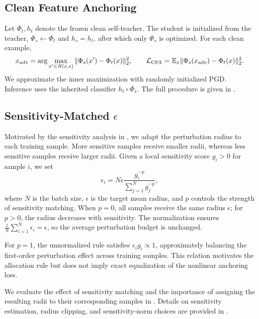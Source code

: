 \documentclass{article} %
\theoremstyle{plain}
\begin{document}
\subsection{Clean Feature Anchoring}
\label{sec:anchor}

Let \(\Phi_t,h_t\) denote the frozen clean self-teacher. The student is
initialized from the teacher, \(\Phi_s\leftarrow\Phi_t\) and \(h_s=h_t\),
after which only \(\Phi_s\) is optimized. For each clean example,
\begin{equation}
x_{\rm adv}
=
\arg\max_{x'\in B(x,\epsilon)}
\|\Phi_s(x')-\Phi_t(x)\|_2^2,
\qquad
\mathcal L_{\rm CFA}
=
\mathbb E_x
\|\Phi_s(x_{\rm adv})-\Phi_t(x)\|_2^2.
\label{eqn:anchor}
\end{equation}
We approximate the inner maximization with randomly initialized PGD. Inference
uses the inherited classifier \(h_t\circ\Phi_s\). The full procedure is given
in .

\subsection{Sensitivity-Matched \(\epsilon\)}
\label{sec:angeps}

Motivated by the sensitivity analysis in
, we adapt the perturbation radius to each
training sample. More sensitive samples receive smaller radii, whereas less
sensitive samples receive larger radii. Given a local sensitivity score
\(g_i>0\) for sample \(i\), we set
\begin{equation}
\epsilon_i
=
N\epsilon
\frac{g_i^{-p}}{\sum_{j=1}^{N} g_j^{-p}},
\label{eqn:angeps_ideal}
\end{equation}
where \(N\) is the batch size, \(\epsilon\) is the target mean radius, and
\(p\) controls the strength of sensitivity matching. When \(p=0\), all
samples receive the same radius \(\epsilon\); for \(p>0\), the radius decreases
with sensitivity. The normalization ensures
\(\frac{1}{N}\sum_{i=1}^{N}\epsilon_i=\epsilon\), so the average perturbation
budget is unchanged.

For \(p=1\), the unnormalized rule satisfies
\(\epsilon_i g_i \propto 1\), approximately balancing the first-order
perturbation effect across training samples. This relation motivates the
allocation rule but does not imply exact equalization of the nonlinear
anchoring loss.

We evaluate the effect of sensitivity matching and the importance of assigning
the resulting radii to their corresponding samples in
. Details on sensitivity estimation,
radius clipping, and sensitivity-norm choices are provided in
.
\end{document}
